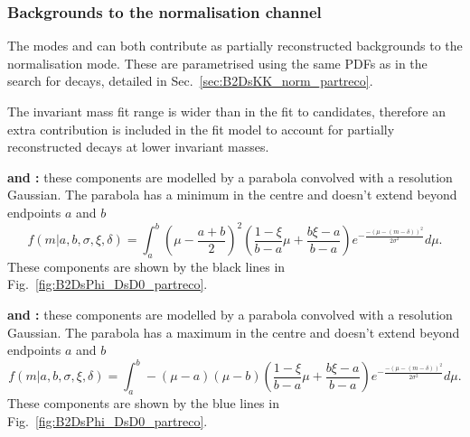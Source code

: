 \subsubsection{Backgrounds to the normalisation channel}

The modes \decay{\Bp}{\Dsp\Dstarzb} and \decay{\Bp}{\Dssp\Dzb} can both contribute as partially reconstructed backgrounds to the \decay{\Bp}{\Dsp\Dzb} normalisation mode. These are parametrised using the same PDFs as in the search for \decay{\Bp}{\Ds\Kp\Km} decays, detailed in Sec.~\ref{sec:B2DsKK_norm_partreco}. 

The invariant mass fit range is wider than in the fit to \decay{\Bp}{\Dsp\Kp\Km} candidates, therefore an extra contribution is included in the fit model to account for partially reconstructed \decay{\Bp}{\Dssp\Dstarzb} decays at lower invariant masses.

\begin{description}
\item \textbf{\decay{\Bp}{(\decay{\Dssp}{\Dsp[\piz]})\Dzb} and \decay{\Bp}{\Dsp(\decay{\Dstarzb}{\Dzb[\piz]})}:} these components are modelled by a parabola convolved with a resolution Gaussian. The parabola has a minimum in the centre and doesn't extend beyond endpoints $a$ and $b$
\begin{equation}
f(m|a,b,\sigma,\xi, \delta) = \int_{a}^{b}\left(\mu-\frac{a+b}{2}\right)^{2} \left( \frac{1-\xi}{b-a}\mu + \frac{b\xi-a}{b-a} \right) e^{-\frac{-(\mu-(m-\delta))^{2}}{2\sigma^{2}}} d\mu.
\label{eq:DsPhi_RooHorns}
\end{equation}
These components are shown by the black lines in Fig.~\ref{fig:B2DsPhi_DsD0_partreco}.

\item \textbf{\decay{\Bp}{(\decay{\Dssp}{\Dsp[\Pgamma]})\Dzb} and \decay{\Bp}{\Dsp(\decay{\Dstarzb}{\Dzb[\Pgamma]})}:} these components are modelled by a parabola convolved with a resolution Gaussian. The parabola has a maximum in the centre and doesn't extend beyond endpoints $a$ and $b$
\begin{equation}
f(m|a,b,\sigma,\xi, \delta) = \int_{a}^{b} -(\mu-a)(\mu-b)\left( \frac{1-\xi}{b-a}\mu + \frac{b\xi-a}{b-a} \right) e^{-\frac{-(\mu-(m-\delta))^{2}}{2\sigma^{2}}} d\mu.
\label{eq:DsPhi_RooHills}
\end{equation}
These components are shown by the blue lines in Fig.~\ref{fig:B2DsPhi_DsD0_partreco}.
\end{description}

